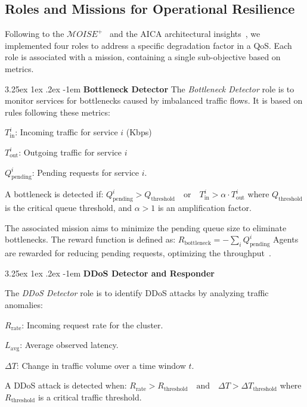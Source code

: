 \documentclass[conference]{IEEEtran}
\makeatletter
\renewcommand\paragraph{\@startsection{paragraph}{5}{\z@}%
  {3.25ex \@plus1ex \@minus.2ex}%
  {-1em}%
  {\normalfont\normalsize\bfseries}}
\makeatother
\begin{document}
\subsection{Roles and Missions for Operational Resilience}

\noindent Following to the $\mathcal{M}OISE^+$~\cite{hubner2002moise} and the AICA architectural insights~\cite{kott2018autonomous}, we implemented four roles to address a specific degradation factor in a QoS.
Each role is associated with a mission, containing a single sub-objective based on metrics.

\noindent \paragraph{\textbf{Bottleneck Detector}} 
%
The \textit{Bottleneck Detector} role is to monitor services for bottlenecks caused by imbalanced traffic flows. It is based on rules following these metrics:
\begin{enumerate*}[label={}, itemjoin={;\quad }]
    \item \( T_{\text{in}}^i \): Incoming traffic for service \( i \) (Kbps)
    \item \( T_{\text{out}}^i \): Outgoing traffic for service \( i \)
    \item \( Q_{\text{pending}}^i \): Pending requests for service \( i \).
\end{enumerate*}
A bottleneck is detected if: $Q_{\text{pending}}^i > Q_{\text{threshold}} \quad \text{or} \quad T_{\text{in}}^i > \alpha \cdot T_{\text{out}}^i$
where \( Q_{\text{threshold}} \) is the critical queue threshold, and \( \alpha > 1 \) is an amplification factor.

The associated mission aims to minimize the pending queue size to eliminate bottlenecks. The reward function is defined as: $R_{\text{bottleneck}} = - \sum_{i} Q_{\text{pending}}^i$
Agents are rewarded for reducing pending requests, optimizing the throughput~\cite{burns2016borg}.

\noindent \paragraph{\textbf{DDoS Detector and Responder}}

The \textit{DDoS Detector} role is to identify DDoS attacks by analyzing traffic anomalies:
\begin{enumerate*}[label={}, itemjoin={;\quad }]
    \item \( R_{\text{rate}} \): Incoming request rate for the cluster.
    \item \( L_{\text{avg}} \): Average observed latency.
    \item \( \Delta T \): Change in traffic volume over a time window \( t \).
\end{enumerate*}
A DDoS attack is detected when:
$R_{\text{rate}} > R_{\text{threshold}} \quad \text{and} \quad \Delta T > \Delta T_{\text{threshold}}$
where \( R_{\text{threshold}} \) is a critical traffic threshold.
\end{document}
